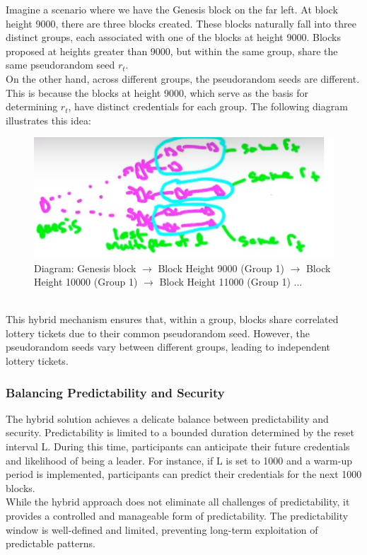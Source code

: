Imagine a scenario where we have the Genesis block on the far left. At block height 9000, there are three blocks created. These blocks naturally fall into three distinct groups, each associated with one of the blocks at height 9000. Blocks proposed at heights greater than 9000, but within the same group, share the same pseudorandom seed $r_t$.\\
On the other hand, across different groups, the pseudorandom seeds are different. This is because the blocks at height 9000, which serve as the basis for determining $r_t$, have distinct credentials for each group. The following diagram illustrates this idea:
\begin{figure}[h]
    \centering
    \includegraphics[scale = 0.5]{figures/f56.png}
    \caption{Diagram: Genesis block $\rightarrow$ Block Height 9000 (Group 1) $\rightarrow$ Block Height 10000 (Group 1) $\rightarrow$ Block Height 11000 (Group 1) ...}
    \label{fig:mesh1}
\end{figure}\\
This hybrid mechanism ensures that, within a group, blocks share correlated lottery tickets due to their common pseudorandom seed. However, the pseudorandom seeds vary between different groups, leading to independent lottery tickets.

\subsubsection{Balancing Predictability and Security}
The hybrid solution achieves a delicate balance between predictability and security. Predictability is limited to a bounded duration determined by the reset interval L. During this time, participants can anticipate their future credentials and likelihood of being a leader. For instance, if L is set to 1000 and a warm-up period is implemented, participants can predict their credentials for the next 1000 blocks.\\
While the hybrid approach does not eliminate all challenges of predictability, it provides a controlled and manageable form of predictability. The predictability window is well-defined and limited, preventing long-term exploitation of predictable patterns.


